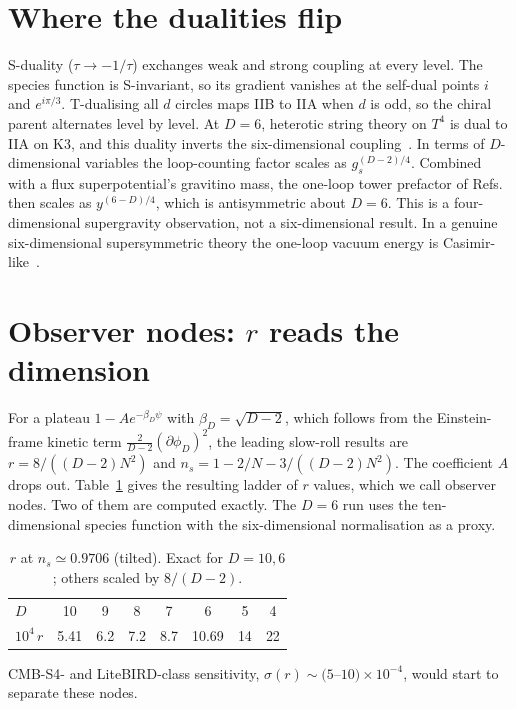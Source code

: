 \documentclass[aps,prd,twocolumn,superscriptaddress,nofootinbib,showkeys]{revtex4-2}
\begin{document}
\section{Where the dualities flip}
S-duality ($\tau\to-1/\tau$) exchanges weak and strong coupling at every level. The species function is S-invariant, so its gradient vanishes at the self-dual points $i$ and $e^{i\pi/3}$. T-dualising all $d$ circles maps IIB to IIA when $d$ is odd, so the chiral parent alternates level by level. At $D=6$, heterotic string theory on $T^4$ is dual to IIA on K3, and this duality inverts the six-dimensional coupling~\cite{W95}. In terms of $D$-dimensional variables the loop-counting factor scales as $g_s^{(D-2)/4}$. Combined with a flux superpotential's gravitino mass, the one-loop tower prefactor of Refs.~\cite{CI} then scales as $y^{(6-D)/4}$, which is antisymmetric about $D=6$. This is a four-dimensional supergravity observation, not a six-dimensional result. In a genuine six-dimensional supersymmetric theory the one-loop vacuum energy is Casimir-like~\cite{SLED}.

\section{Observer nodes: $r$ reads the dimension}
For a plateau $1-Ae^{-\beta_D\psi}$ with $\beta_D=\sqrt{D-2}$, which follows from the Einstein-frame kinetic term $\tfrac{2}{D-2}(\partial\phi_D)^2$, the leading slow-roll results are $r=8/((D-2)N^2)$ and $n_s=1-2/N-3/((D-2)N^2)$. The coefficient $A$ drops out. Table~\ref{tab:r} gives the resulting ladder of $r$ values, which we call observer nodes. Two of them are computed exactly. The $D=6$ run uses the ten-dimensional species function with the six-dimensional normalisation as a proxy.
\begin{table}[b]\caption{$r$ at $n_s\simeq0.9706$ (tilted). Exact for $D=10,6$; others scaled by $8/(D-2)$.}\label{tab:r}
\begin{ruledtabular}\footnotesize\begin{tabular}{lccccccc}
$D$ & 10 & 9 & 8 & 7 & 6 & 5 & 4\\
$10^4\,r$ & 5.41 & 6.2 & 7.2 & 8.7 & 10.69 & 14 & 22\\
\end{tabular}\end{ruledtabular}\end{table}
CMB-S4- and LiteBIRD-class sensitivity, $\sigma(r)\sim(5$--$10)\times10^{-4}$, would start to separate these nodes.
\end{document}
